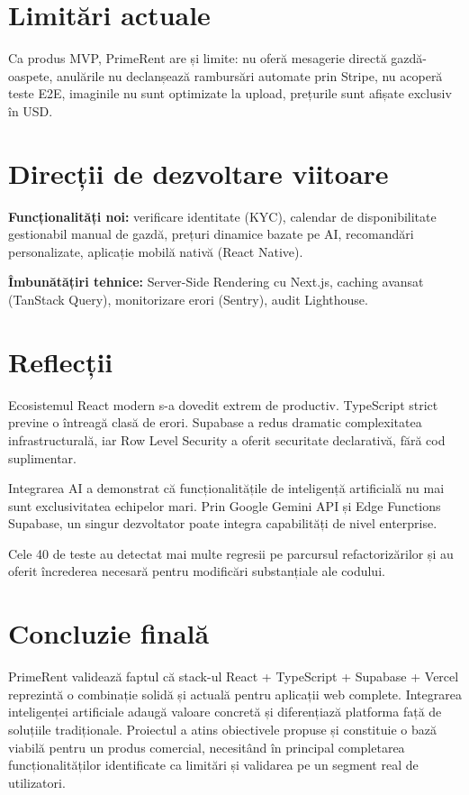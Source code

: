 \documentclass[12pt,a4paper,oneside]{report}
\begin{document}
\section{Limitări actuale}

Ca produs MVP, PrimeRent are și limite: nu oferă mesagerie directă gazdă-oaspete, anulările nu declanșează rambursări automate prin Stripe, nu acoperă teste E2E, imaginile nu sunt optimizate la upload, prețurile sunt afișate exclusiv în USD.

\section{Direcții de dezvoltare viitoare}

\textbf{Funcționalități noi:} verificare identitate (KYC), calendar de disponibilitate gestionabil manual de gazdă, prețuri dinamice bazate pe AI, recomandări personalizate, aplicație mobilă nativă (React Native).

\textbf{Îmbunătățiri tehnice:} Server-Side Rendering cu Next.js, caching avansat (TanStack Query), monitorizare erori (Sentry), audit Lighthouse.

\section{Reflecții}

Ecosistemul React modern s-a dovedit extrem de productiv. TypeScript strict previne o întreagă clasă de erori. Supabase a redus dramatic complexitatea infrastructurală, iar Row Level Security a oferit securitate declarativă, fără cod suplimentar.

Integrarea AI a demonstrat că funcționalitățile de inteligență artificială nu mai sunt exclusivitatea echipelor mari. Prin Google Gemini API și Edge Functions Supabase, un singur dezvoltator poate integra capabilități de nivel enterprise.

Cele 40 de teste au detectat mai multe regresii pe parcursul refactorizărilor și au oferit încrederea necesară pentru modificări substanțiale ale codului.

\section{Concluzie finală}

PrimeRent validează faptul că stack-ul React + TypeScript + Supabase + Vercel reprezintă o combinație solidă și actuală pentru aplicații web complete. Integrarea inteligenței artificiale adaugă valoare concretă și diferențiază platforma față de soluțiile tradiționale. Proiectul a atins obiectivele propuse și constituie o bază viabilă pentru un produs comercial, necesitând în principal completarea funcționalităților identificate ca limitări și validarea pe un segment real de utilizatori.
\end{document}
